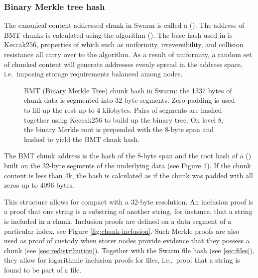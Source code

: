 \subsubsection{Binary Merkle tree hash}

The canonical content addressed chunk in Swarm is called a  ().
The address of BMT chunks is calculated using the  algorithm (). The base hash used in  is Keccak256, properties of which such as uniformity, irreversibility, and collision resistance all carry over to the  algorithm. As a result of uniformity, a random set of chunked content will generate addresses evenly spread in the address space, i.e.\ imposing storage requirements balanced among nodes.


\begin{figure}[htbp]
   \centering
   \resizebox{1\textwidth}{!}{
   }
   \caption[BMT: Binary Merkle Tree hash used as chunk hash in Swarm \statusgreen]{BMT (Binary Merkle Tree) chunk hash in Swarm: the 1337 bytes of chunk data is segmented into 32-byte segments. Zero padding is used to fill up the rest up to 4 kilobytes. Pairs of segments are hashed together using Keccak256 to build up the binary tree. On level 8, the binary Merkle root is prepended with the 8-byte span and hashed to yield the BMT chunk hash.}
   \label{fig:BMT}
\end{figure}

The BMT chunk address is the hash of the 8-byte span and the root hash of a  () built on the 32-byte segments of the underlying data (see Figure \ref{fig:BMT}). If the chunk content is less than 4k, the hash is calculated as if the chunk was padded with all zeros up to 4096 bytes.

This structure allows for compact  with a 32-byte resolution. An inclusion proof is a proof that one string is a substring of another string, for instance, that a string is included in a chunk. Inclusion proofs are defined on a data segment of a particular index, see Figure \ref{fig:chunk-inclusion}. Such Merkle proofs are also used as proof of custody when storer nodes provide evidence that they possess a chunk (see \ref{sec:redistribution}). Together with the Swarm file hash (see \ref{sec:files}), they allow for logarithmic inclusion proofs for files, i.e.,\ proof that a string is found to be part of a file.


